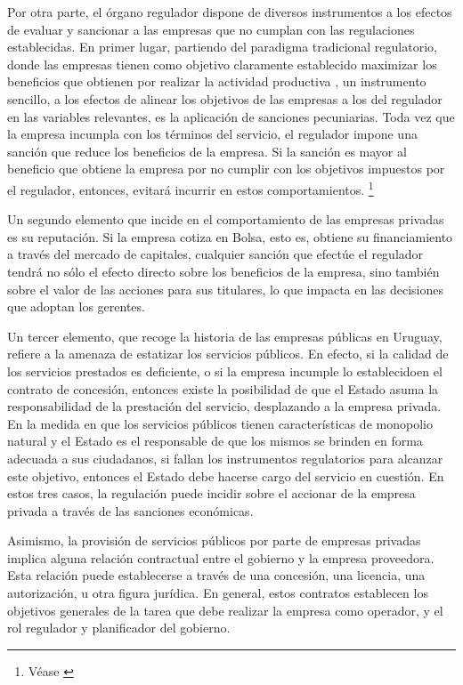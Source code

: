 \documentclass[
  12pt,
  spanish,
]{book}
\begin{document}
Por otra parte, el órgano regulador dispone de diversos instrumentos a los efectos de evaluar y sancionar a las empresas que no cumplan con las regulaciones establecidas. En primer lugar, partiendo del paradigma tradicional regulatorio, donde las empresas tienen como objetivo claramente establecido maximizar los beneficios que obtienen por realizar la actividad productiva \citep{Armstrong2007}, un instrumento sencillo, a los efectos de alinear los objetivos de las empresas a los del regulador en las variables relevantes, es la aplicación de sanciones pecuniarias. Toda vez que la empresa incumpla con los términos del servicio, el regulador impone una sanción que reduce los beneficios de la empresa. Si la sanción es mayor al beneficio que obtiene la empresa por no cumplir con los objetivos impuestos por el regulador, entonces, evitará incurrir en estos comportamientos.
\footnote{Véase \citep{Becker1968}}

Un segundo elemento que incide en el comportamiento de las empresas privadas es su reputación. Si la empresa cotiza en Bolsa, esto es, obtiene su financiamiento a través del mercado de capitales, cualquier sanción que efectúe el regulador tendrá no sólo el efecto directo sobre los beneficios de la empresa, sino también sobre el valor de las acciones para sus titulares, lo que impacta en las decisiones que adoptan los gerentes.

Un tercer elemento, que recoge la historia de las empresas públicas en Uruguay, refiere a la amenaza de estatizar los servicios públicos. En efecto, si la calidad de los servicios prestados es deficiente, o si la empresa incumple lo establecidoen el contrato de concesión, entonces existe la posibilidad de que el Estado asuma la responsabilidad de la prestación del servicio, desplazando a la empresa privada. En la medida en que los servicios públicos tienen características de monopolio natural y el Estado es el responsable de que los mismos se brinden en forma adecuada a sus ciudadanos, si fallan los instrumentos regulatorios para alcanzar este objetivo, entonces el Estado debe hacerse cargo del servicio en cuestión. En estos tres casos, la regulación puede incidir sobre el accionar de la empresa privada a través de las sanciones económicas.

Asimismo, la provisión de servicios públicos por parte de empresas privadas implica alguna relación contractual entre el gobierno y la empresa proveedora. Esta relación puede establecerse a través de una concesión, una licencia, una autorización, u otra figura jurídica. En general, estos contratos establecen los objetivos generales de la tarea que debe realizar la empresa como operador, y el rol regulador y planificador del gobierno.
\end{document}
